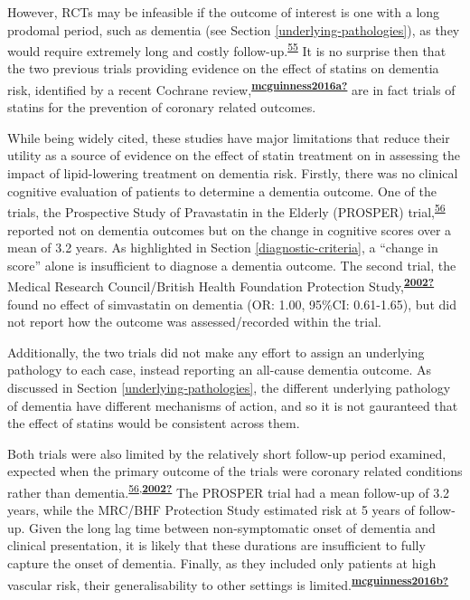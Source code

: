 \documentclass[a4paper, twoside]{templates/ociamthesis}
\begin{document}
However, RCTs may be infeasible if the outcome of interest is one with a long prodomal period, such as dementia (see Section \ref{underlying-pathologies}), as they would require extremely long and costly follow-up.\textsuperscript{\protect\hyperlink{ref-ritchie2015}{55}} It is no surprise then that the two previous trials providing evidence on the effect of statins on dementia risk, identified by a recent Cochrane review,\textsuperscript{\protect\hyperlink{ref-mcguinness2016a}{\textbf{mcguinness2016a?}}} are in fact trials of statins for the prevention of coronary related outcomes.

While being widely cited, these studies have major limitations that reduce their utility as a source of evidence on the effect of statin treatment on in assessing the impact of lipid-lowering treatment on dementia risk. Firstly, there was no clinical cognitive evaluation of patients to determine a dementia outcome. One of the trials, the Prospective Study of Pravastatin in the Elderly (PROSPER) trial,\textsuperscript{\protect\hyperlink{ref-trompet2010}{56}} reported not on dementia outcomes but on the change in cognitive scores over a mean of 3.2 years. As highlighted in Section \ref{diagnostic-criteria}, a ``change in score'' alone is insufficient to diagnose a dementia outcome. The second trial, the Medical Research Council/British Health Foundation Protection Study,\textsuperscript{\protect\hyperlink{ref-2002}{\textbf{2002?}}} found no effect of simvastatin on dementia (OR: 1.00, 95\%CI: 0.61-1.65), but did not report how the outcome was assessed/recorded within the trial.

Additionally, the two trials did not make any effort to assign an underlying pathology to each case, instead reporting an all-cause dementia outcome. As discussed in Section \ref{underlying-pathologies}, the different underlying pathology of dementia have different mechanisms of action, and so it is not gauranteed that the effect of statins would be consistent across them.

Both trials were also limited by the relatively short follow-up period examined, expected when the primary outcome of the trials were coronary related conditions rather than dementia.\textsuperscript{\protect\hyperlink{ref-trompet2010}{56},\protect\hyperlink{ref-2002}{\textbf{2002?}}} The PROSPER trial had a mean follow-up of 3.2 years, while the MRC/BHF Protection Study estimated risk at 5 years of follow-up. Given the long lag time between non-symptomatic onset of dementia and clinical presentation, it is likely that these durations are insufficient to fully capture the onset of dementia. Finally, as they included only patients at high vascular risk, their generalisability to other settings is limited.\textsuperscript{\protect\hyperlink{ref-mcguinness2016b}{\textbf{mcguinness2016b?}}}
\end{document}
